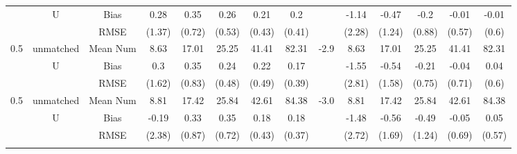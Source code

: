 \begin{tabular}{@{\extracolsep{5pt}}lc|cccccc|lccccc}
 & U & Bias & 0.28 & 0.35 & 0.26 & 0.21 & 0.2 &  & -1.14 & -0.47 & -0.2 & -0.01 & -0.01 \\
 &  & RMSE & (1.37) & (0.72) & (0.53) & (0.43) & (0.41) &  & (2.28) & (1.24) & (0.88) & (0.57) & (0.6) \\
0.5 & unmatched & Mean Num & 8.63 & 17.01 & 25.25 & 41.41 & 82.31 & -2.9 & 8.63 & 17.01 & 25.25 & 41.41 & 82.31 \\
 & U & Bias & 0.3 & 0.35 & 0.24 & 0.22 & 0.17 &  & -1.55 & -0.54 & -0.21 & -0.04 & 0.04 \\
 &  & RMSE & (1.62) & (0.83) & (0.48) & (0.49) & (0.39) &  & (2.81) & (1.58) & (0.75) & (0.71) & (0.6) \\
0.5 & unmatched & Mean Num & 8.81 & 17.42 & 25.84 & 42.61 & 84.38 & -3.0 & 8.81 & 17.42 & 25.84 & 42.61 & 84.38 \\
 & U & Bias & -0.19 & 0.33 & 0.35 & 0.18 & 0.18 &  & -1.48 & -0.56 & -0.49 & -0.05 & 0.05 \\
 &  & RMSE & (2.38) & (0.87) & (0.72) & (0.43) & (0.37) &  & (2.72) & (1.69) & (1.24) & (0.69) & (0.57) \\
 &  &  &  &  &  &  &  &  &  &  &  &  &  \\
\hline 
\bottomrule 
\end{tabular}
